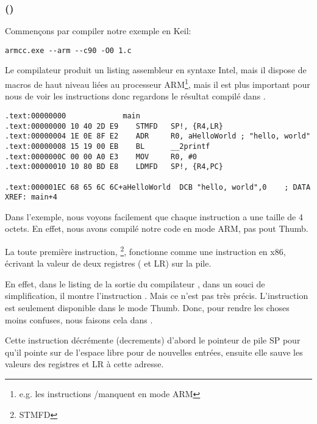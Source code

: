 \subsubsection{\NonOptimizingKeilVI (\ARMMode)}

Commençons par compiler notre exemple en Keil:

\begin{lstlisting}
armcc.exe --arm --c90 -O0 1.c 
\end{lstlisting}

\myindex{\IntelSyntax}
Le compilateur  produit un listing assembleur en syntaxe Intel, mais il dispose de macros
de haut niveau liées au processeur ARM\footnote{e.g. les instructions \PUSH/\POP manquent en mode
ARM}, mais il est plus important pour nous de voir les instructions  donc
regardons le résultat compilé dans \IDA.

\begin{lstlisting}[caption=\NonOptimizingKeilVI (\ARMMode) \IDA,style=customasmARM]
.text:00000000             main
.text:00000000 10 40 2D E9    STMFD   SP!, {R4,LR}
.text:00000004 1E 0E 8F E2    ADR     R0, aHelloWorld ; "hello, world"
.text:00000008 15 19 00 EB    BL      __2printf
.text:0000000C 00 00 A0 E3    MOV     R0, #0
.text:00000010 10 80 BD E8    LDMFD   SP!, {R4,PC}

.text:000001EC 68 65 6C 6C+aHelloWorld  DCB "hello, world",0    ; DATA XREF: main+4
\end{lstlisting}

Dans l'exemple, nous voyons facilement que chaque instruction a une taille de 4 octets.
En effet, nous avons compilé notre code en mode ARM, pas pout Thumb.

La toute première instruction, \footnote{\ac{STMFD}},
fonctionne comme une instruction \PUSH en x86, écrivant la valeur de deux registres
( et \ac{LR}) sur la pile.

En effet, dans le listing de la sortie du compilateur , dans un souci
de simplification, il montre l'instruction .
Mais ce n'est pas très précis. L'instruction \PUSH est seulement disponible dans
le mode Thumb.  Donc, pour rendre les choses moins confuses, nous faisons cela
dans \IDA.

Cette instruction décrémente (\glspl{decrement}) d'abord le pointeur de pile \ac{SP}
pour qu'il pointe sur de l'espace libre pour de nouvelles entrées, ensuite elle
sauve les valeurs des registres  et \ac{LR} à cette adresse.


